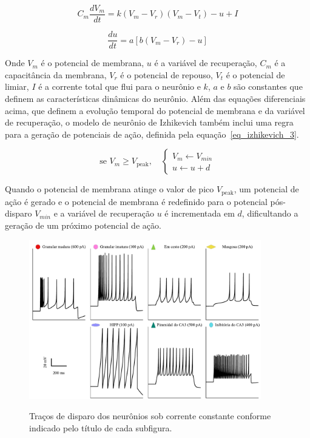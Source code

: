 \begin{equation}
\label{eq_izhikevich_1}
C_m \frac{dV_m}{dt} = k (V_m - V_r)(V_m - V_t) - u + I
\end{equation}

\begin{equation}
\label{eq_izhikevich_2}
\frac{du}{dt} = a [b(V_m-V_r) - u]
\end{equation}

Onde $V_m$ é o potencial de membrana, $u$ é a variável de recuperação, $C_m$ é a capacitância da membrana, $V_r$ é o
potencial de repouso, $V_t$ é o potencial de limiar, $I$ é a corrente total que flui para o neurônio e $k$, $a$ e $b$ são
constantes que definem as características dinâmicas do neurônio. Além das equações diferenciais acima, que definem a evolução
temporal do potencial de membrana e da variável de recuperação, o modelo de neurônio de Izhikevich também inclui uma regra para
a geração de potenciais de ação, definida pela equação~\ref{eq_izhikevich_3}.

\begin{equation}
\label{eq_izhikevich_3}
\text{se } V_m \geq V_{\text{peak}}, \quad
\begin{cases}
V_m \gets V_{min} \\
u \gets u + d
\end{cases}
\end{equation}

Quando o potencial de membrana atinge o valor de pico $V_{\text{peak}}$, um potencial de ação é gerado e o potencial de membrana é
redefinido para o potencial pós-disparo $V_{min}$ e a variável de recuperação $u$ é incrementada em $d$, dificultando a geração de
um próximo potencial de ação.


\begin{figure}[H]
    \centering
    \caption{Traços de disparo dos neurônios sob corrente constante conforme indicado pelo título de cada subfigura.}
    \includegraphics[width=0.9\textwidth]{figuras/spike_traces}
    \label{fig:spike_traces}
\end{figure}

